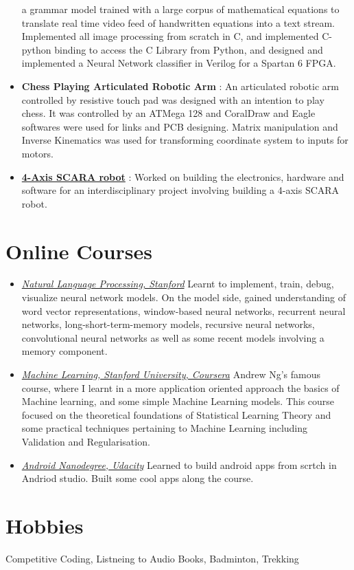\documentclass[margin, centered]{res}
\begin{document}
\begin{resume}
\begin{itemize}[leftmargin=*]
a grammar model trained with a large corpus of mathematical equations to translate real time video
feed of handwritten equations into a text stream. Implemented all image processing from scratch in
C, and implemented C-python binding to access the C Library from Python, and designed and
implemented a Neural Network classifier in Verilog for a Spartan 6 FPGA.
\item \textbf{{Chess Playing Articulated Robotic Arm}}
 : An articulated robotic arm controlled by resistive touch pad was designed with an intention to play
chess. It was controlled by an ATMega 128 and CoralDraw and Eagle softwares were used for links
and PCB designing. Matrix manipulation and Inverse Kinematics was used for transforming
coordinate system to inputs for motors.
\item \textbf{\href{https://github.com/projectscara2014/scara}{4-Axis SCARA robot}} : Worked on building the electronics, hardware and software for an interdisciplinary project involving
building a 4-axis SCARA robot.
\end{itemize}

\section{Online Courses}
\begin{itemize}[leftmargin=*]
 \item \href{http://web.stanford.edu/class/cs224n/}{\emph{Natural Language Processing, Stanford}} Learnt to implement, train, debug, visualize neural network models. On the model side, gained
understanding of word vector representations, window-based neural networks, recurrent neural
networks, long-short-term-memory models, recursive neural networks, convolutional neural networks
as well as some recent models involving a memory component. 
\item \href{http://www.kvpy.org.in/main/}{\emph{Machine Learning, Stanford University, Coursera}} Andrew Ng’s famous course, where I learnt in a more application oriented approach the basics of
Machine learning, and some simple Machine Learning models.
This course focused on the theoretical foundations of Statistical Learning Theory and some practical techniques
pertaining to Machine Learning including Validation and Regularisation.
\item \href{https://github.com/akash9182/My-Android-Nanodegree-Projects}{\emph{Android Nanodegree, Udacity}}
Learned to build android apps from scrtch in Andriod studio. Built some cool apps along the course.  
\end{itemize}



\section{Hobbies}
Competitive Coding, Listneing to Audio Books, Badminton, Trekking
\end{resume}
\end{document}
